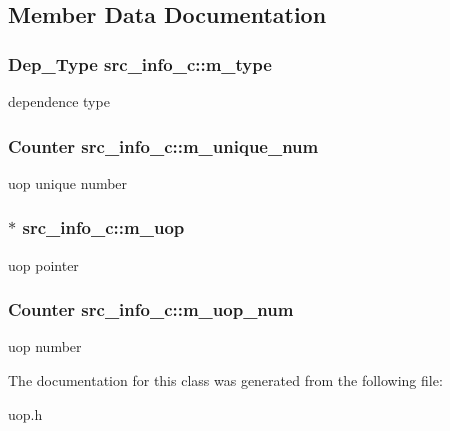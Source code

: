 \subsection{Member Data Documentation}
\hypertarget{classsrc__info__c_af096f1eef285470cb6c8be0f1825f933}{
\subsubsection[{m\_\-type}]{\setlength{\rightskip}{0pt plus 5cm}Dep\_\-Type {\bf src\_\-info\_\-c::m\_\-type}}}
\label{classsrc__info__c_af096f1eef285470cb6c8be0f1825f933}
dependence type \hypertarget{classsrc__info__c_ac423ede8bc77893cf776cdebba9f081f}{
\subsubsection[{m\_\-unique\_\-num}]{\setlength{\rightskip}{0pt plus 5cm}Counter {\bf src\_\-info\_\-c::m\_\-unique\_\-num}}}
\label{classsrc__info__c_ac423ede8bc77893cf776cdebba9f081f}
uop unique number \hypertarget{classsrc__info__c_a4662ae6dcff03aa4ece558599eea0ff6}{
\subsubsection[{m\_\-uop}]{$\ast$ {\bf src\_\-info\_\-c::m\_\-uop}}}
\label{classsrc__info__c_a4662ae6dcff03aa4ece558599eea0ff6}
uop pointer \hypertarget{classsrc__info__c_a81bb86aa213c5ef9ccb17f51c3d37dca}{
\subsubsection[{m\_\-uop\_\-num}]{\setlength{\rightskip}{0pt plus 5cm}Counter {\bf src\_\-info\_\-c::m\_\-uop\_\-num}}}
\label{classsrc__info__c_a81bb86aa213c5ef9ccb17f51c3d37dca}
uop number 

The documentation for this class was generated from the following file:\begin{DoxyCompactItemize}
\item 
uop.h\end{DoxyCompactItemize}

